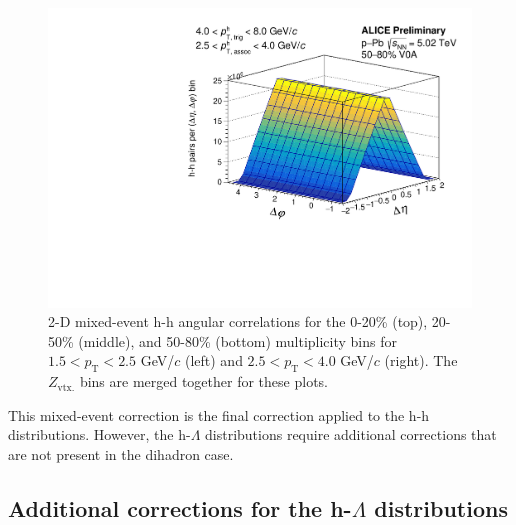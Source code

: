 \begin{figure}[ht]
\begin{minipage}{0.48\textwidth}
		\includegraphics[width=\textwidth]{figures/analysis/h_h_2d_mixed_fancy_label_50_80_highpt.pdf}
	\end{minipage}
	\caption{2-D mixed-event h-h angular correlations for the 0-20\% (top), 20-50\% (middle), and 50-80\% (bottom) multiplicity bins for $1.5 < p_{\text{T}} < 2.5$ GeV/$c$ (left) and $2.5 < p_{\text{T}} < 4.0$ GeV/$c$ (right). The $Z_{\text{vtx.}}$ bins are merged together for these plots.}
	\label{fig:h_h_2d_mixed}
\end{figure}


This mixed-event correction is the final correction applied to the h-h distributions. However, the h-$\Lambda$ distributions require additional corrections that are not present in the dihadron case.

\clearpage

\subsection{Additional corrections for the h-$\Lambda$ distributions}
\label{sec:lambda_corrections}

